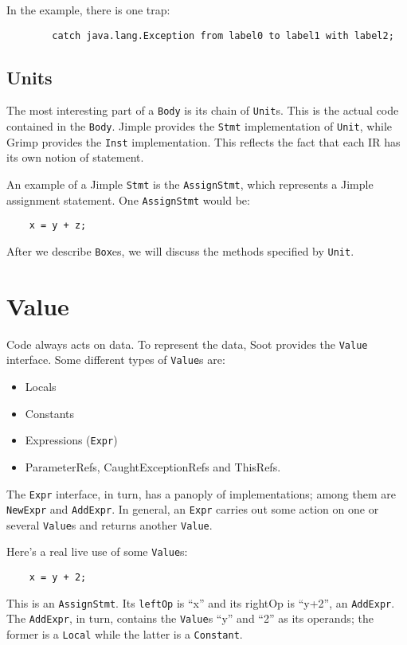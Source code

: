 \documentclass{article}
\begin{document}
In the example, there is one trap:
\begin{verbatim}
        catch java.lang.Exception from label0 to label1 with label2;
\end{verbatim}

\subsection{Units}

The most interesting part of a {\tt Body} is its chain of {\tt Unit}s.
This is the actual code contained in the {\tt Body}.  Jimple provides the
{\tt Stmt} implementation of {\tt Unit}, while Grimp provides the {\tt Inst}
implementation.  This reflects the fact that each IR has its own notion of
statement.

An example of a Jimple {\tt Stmt} is the {\tt AssignStmt}, which represents
a Jimple assignment statement.  One {\tt AssignStmt} would be:
\begin{verbatim}
    x = y + z;
\end{verbatim}

After we describe {\tt Box}es, we will discuss the methods specified by
{\tt Unit}.

\section{Value}
Code always acts on data.  To represent the data, Soot provides the
{\tt Value} interface.  Some different types of {\tt Value}s are:
\begin{itemize}
\item Locals
\item Constants
\item Expressions ({\tt Expr})
\item ParameterRefs, CaughtExceptionRefs and ThisRefs.
\end{itemize}

The {\tt Expr} interface, in turn, has a panoply of implementations;
among them are {\tt NewExpr} and {\tt AddExpr}.  In general, an {\tt Expr}
carries out some action on one or several {\tt Value}s and returns another
{\tt Value}.

Here's a real live use of some {\tt Value}s:
\begin{verbatim}
    x = y + 2;
\end{verbatim}

This is an {\tt AssignStmt}.  Its {\tt leftOp} is ``x'' and its rightOp
is ``y+2'', an {\tt AddExpr}.  The {\tt AddExpr}, in turn, contains the
{\tt Value}s ``y'' and ``2'' as its operands; the former is a {\tt Local}
while the latter is a {\tt Constant}.
\end{document}
